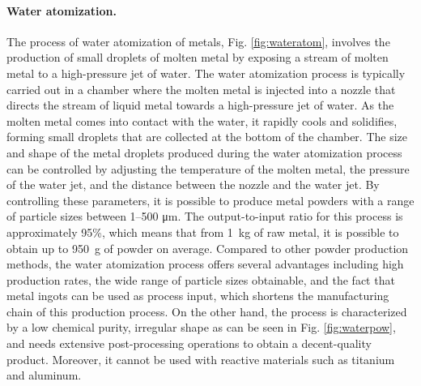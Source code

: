 \paragraph{Water atomization.}The process of water atomization of metals, Fig. \ref{fig:wateratom}, involves the production of small droplets of molten metal by exposing a stream of molten metal to a high-pressure jet of water. The water atomization process is typically carried out in a chamber where the molten metal is injected into a nozzle that directs the stream of liquid metal towards a high-pressure jet of water. As the molten metal comes into contact with the water, it rapidly cools and solidifies, forming small droplets that are collected at the bottom of the chamber. The size and shape of the metal droplets produced during the water atomization process can be controlled by adjusting the temperature of the molten metal, the pressure of the water jet, and the distance between the nozzle and the water jet. By controlling these parameters, it is possible to produce metal powders with a range of particle sizes between \numrange[range-phrase = --]{1}{500} \unit{\micro\metre}. The output-to-input ratio for this process is approximately 95\%, which means that from \SI{1}{\kilo\gram} of raw metal, it is possible to obtain up to \SI{950}{\gram} of powder on average. Compared to other powder production methods, the water atomization process offers several advantages including high production rates, the wide range of particle sizes obtainable, and the fact that metal ingots can be used as process input, which shortens the manufacturing chain of this production process. On the other hand, the process is characterized by a low chemical purity, irregular shape as can be seen in Fig. \ref{fig:waterpow}, and needs extensive post-processing operations to obtain a decent-quality product. Moreover, it cannot be used with reactive materials such as titanium and aluminum.
